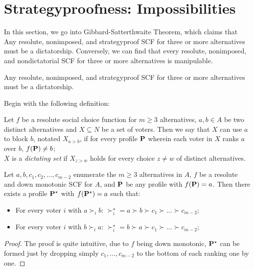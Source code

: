 \section{Strategyproofness: Impossibilities}\label{straproof_imp}

In this section, we go into Gibbard-Satterthwaite Theorem, which claims that Any resolute, nonimposed, and strategyproof SCF for three or more alternatives must be a dictatorship. Conversely, we can find that every resolute, nonimposed, and nondictatorial SCF for three or more alternatives is manipulable.

\begin{theorem}
    \label{GSTheorem}
    Any resolute, nonimposed, and strategyproof SCF for three or more alternatives must be a dictatorship.
\end{theorem}

Begin with the following definition:

\begin{definition}
    Let $f$ be a resolute social choice function for $m \geq 3$ alternatives, $a, b \in A$ be two distinct alternatives and $X \subseteq N$ be a set of voters. Then we say that $X$ can use $a$ to block $b$, notated $X_{a > b}$, if for every profile $\mathbf{P}$ wherein each voter in $X$ ranks $a$ over $b$, $f(\mathbf{P}) \neq b$; \\
    $X$ is a \emph{dictating set} if $X_{z>w}$ holds for every choice $z \neq w$ of distinct alternatives.
\end{definition}

\begin{lemma}
    \label{push_down_lemma}
    Let $a,b,c_1,c_2,\dots,c_{m-2}$ enumerate the $m \geq 3$ alternatives in $A$, $f$ be a resolute and down monotonic SCF for $A$, and $\mathbf{P}$ be any profile with $f(\mathbf{P}) = a$. Then there exists a profile $\mathbf{P}^\star$ with $f (\mathbf{P}^\star) = a$ such that:
    \begin{itemize}
        \item For every voter $i$ with $a \succ_i b$: $\succ^\star_i = a \succ b \succ c_1 \succ \dots \succ c_{m-2}$;
        \item For every voter $i$ with $b \succ_i a$: $\succ^\star_i = b \succ a \succ c_1 \succ \dots \succ c_{m-2}$;
    \end{itemize}
\end{lemma}

\begin{proof}
    The proof is quite intuitive, due to $f$ being down monotonic, $\mathbf{P}^\star$ can be formed just by dropping simply $c_1,\dots,c_{m-2}$ to the bottom of each ranking one by one. 
\end{proof}

